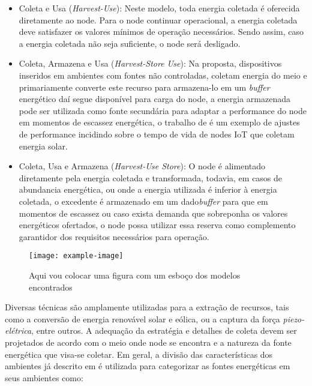 \begin{itemize}
    \item Coleta e Usa (\textit{Harvest-Use}): Neste modelo, toda energia coletada é oferecida diretamente ao node. Para o node continuar operacional, a energia coletada deve satisfazer os valores mínimos de operação necessários. Sendo assim, caso a energia coletada não seja suficiente, o node será desligado. 
    \item Coleta, Armazena e Usa (\textit{Harvest-Store Use}): Na proposta, dispositivos inseridos em ambientes com fontes não controladas, coletam energia do meio e primariamente converte este recurso para armazena-lo em um \textit{buffer} energético daí segue disponível para carga do node, a energia armazenada pode ser utilizada como fonte secundária para adaptar a performance do node em momentos de escassez energética, o trabalho de \cite{Lee2018-iz} é um exemplo de ajustes de performance incidindo sobre o tempo de vida de nodes \ac{IoT} que coletam energia solar.
    \item Coleta, Usa e Armazena (\textit{Harvest-Use Store}): O node é alimentado diretamente pela energia coletada e transformada, todavia, em casos de abundancia energética, ou onde a energia utilizada é inferior à energia coletada, o excedente é armazenado em um dado\textit{buffer} para que em momentos de escassez ou caso exista demanda que sobreponha os valores energéticos ofertados, o node possa utilizar essa reserva como complemento garantidor dos requisitos necessários para operação.
\end{itemize}

\begin{figure}[h]
\noindent\texttt{[image: example-image]} 
\caption{Aqui vou colocar uma figura com um esboço dos modelos encontrados}
\centering
\end{figure}

Diversas técnicas são amplamente utilizadas para a extração de recursos, tais como a conversão de energia renovável solar e eólica, ou a captura da força \textit{piezo-elétrica}, entre outros. A adequação da estratégia e detalhes de coleta devem ser projetados de acordo com o meio onde node se encontra e a natureza da fonte energética que visa-se coletar. Em geral, a divisão das características dos ambientes já descrito em \cite{kansal_power_2007} é utilizada para categorizar as fontes energéticas em seus ambientes como:


